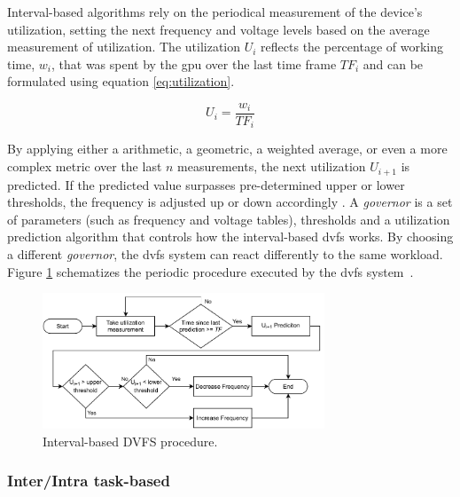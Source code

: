 Interval-based algorithms rely on the periodical measurement of the device's utilization, setting the next frequency and voltage levels based on the average measurement of utilization. The utilization $U_{i}$ reflects the percentage of working time, $w_{i}$, that was spent by the \acrshort{gpu} over the last time frame $TF_{i}$ and can be formulated using equation \ref{eq:utilization}.

\begin{equation}
    U_i=\frac{w_i}{TF_i}
    \label{eq:utilization}
\end{equation}

By applying either a arithmetic, a geometric, a weighted average, or even a more complex metric over the last $n$  measurements,  the next utilization $U_{i+1}$ is predicted. If the predicted value surpasses pre-determined upper or lower thresholds, the frequency is adjusted up or down accordingly \cite{seongki_gpgpu-perf:_2015}. 
A \textit{governor} is a set of parameters (such as frequency and voltage tables), thresholds and a utilization prediction algorithm that controls how the interval-based \acrshort{dvfs} works. By choosing a different \textit{governor}, the \acrshort{dvfs} system can react differently to the same workload. Figure \ref{fig:DVFSprocedure} schematizes the periodic procedure executed by the \acrshort{dvfs} system~\cite{seongki_gpgpu-perf:_2015}. 

\begin{figure}[htb]
  \centering
  \includegraphics[width=0.75\textwidth]{Figures/Background/DVFSprogram.pdf}
  \caption{Interval-based DVFS procedure.}
  \label{fig:DVFSprocedure}
\end{figure}

\subsubsection{Inter/Intra task-based}


